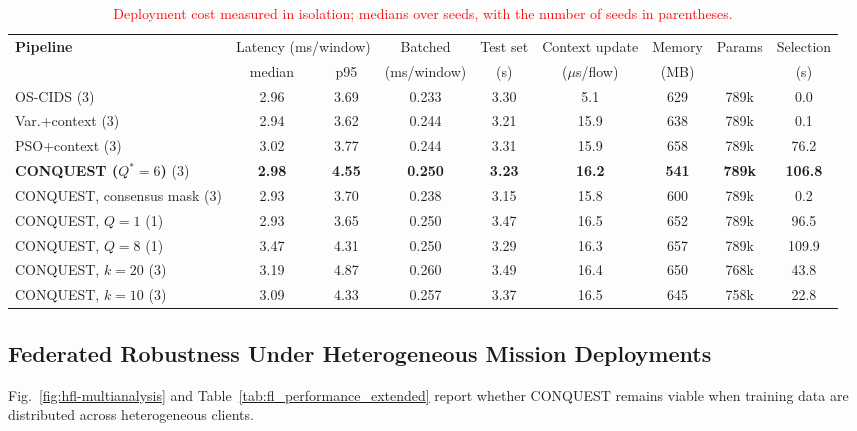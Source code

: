 \documentclass[conference]{IEEEtran}
\begin{document}
\begin{table}[!t]
\centering
\caption{\textcolor{red}{Deployment cost measured in isolation; medians over seeds, with the number of seeds in parentheses.}}
\label{tab:latency_profile_qcids}
\color{red}
\setlength{\tabcolsep}{4pt}
\begin{tabular}{lcccccccc}
\hline\toprule
\textbf{Pipeline} & \multicolumn{2}{c}{Latency (ms/window)} & Batched & Test set & Context update & Memory & Params & Selection \\
 & median & p95 & (ms/window) & (s) & ($\mu$s/flow) & (MB) & & (s) \\
\hline\toprule
OS-CIDS (3) & 2.96 & 3.69 & 0.233 & 3.30 & 5.1 & 629 & 789k & 0.0 \\
Var.+context (3) & 2.94 & 3.62 & 0.244 & 3.21 & 15.9 & 638 & 789k & 0.1 \\
PSO+context (3) & 3.02 & 3.77 & 0.244 & 3.31 & 15.9 & 658 & 789k & 76.2 \\
\textbf{CONQUEST ($Q^{*}{=}6$)} (3) & \textbf{2.98} & \textbf{4.55} & \textbf{0.250} & \textbf{3.23} & \textbf{16.2} & \textbf{541} & \textbf{789k} & \textbf{106.8} \\
CONQUEST, consensus mask (3) & 2.93 & 3.70 & 0.238 & 3.15 & 15.8 & 600 & 789k & 0.2 \\
CONQUEST, $Q{=}1$ (1) & 2.93 & 3.65 & 0.250 & 3.47 & 16.5 & 652 & 789k & 96.5 \\
CONQUEST, $Q{=}8$ (1) & 3.47 & 4.31 & 0.250 & 3.29 & 16.3 & 657 & 789k & 109.9 \\
CONQUEST, $k{=}20$ (3) & 3.19 & 4.87 & 0.260 & 3.49 & 16.4 & 650 & 768k & 43.8 \\
CONQUEST, $k{=}10$ (3) & 3.09 & 4.33 & 0.257 & 3.37 & 16.5 & 645 & 758k & 22.8 \\
\hline\toprule
\end{tabular}
\end{table}


\subsection{Federated Robustness Under Heterogeneous Mission Deployments}
\label{subsec:obj3_heterogeneity}
Fig.~\ref{fig:hfl-multianalysis} and
Table~\ref{tab:fl_performance_extended} report whether CONQUEST
remains viable when training data are distributed across
heterogeneous clients.
\end{document}
